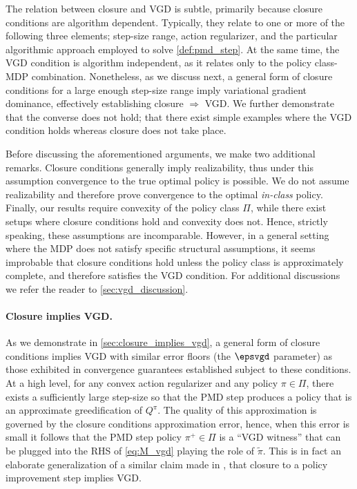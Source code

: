 The relation between closure and VGD is subtle, primarily because closure conditions are algorithm dependent. Typically, they relate to one or more of the following three elements; step-size range, action regularizer, and the particular algorithmic approach employed to solve \cref{def:pmd_step}.
At the same time, the VGD condition is algorithm independent, as it relates only to the policy class-MDP combination.
Nonetheless, as we discuss next, a general form of closure conditions for a large enough step-size range imply variational gradient dominance, effectively establishing closure $\Rightarrow$ VGD.
We further demonstrate that the converse does not hold; that there exist simple examples where the VGD condition holds whereas closure does not take place.


Before discussing the aforementioned arguments, we make two additional remarks. Closure conditions generally imply realizability, thus under this assumption convergence to the true optimal policy is possible. We do not assume realizability and therefore prove convergence to the optimal \emph{in-class} policy.
Finally, our results require convexity of the policy class $\Pi$, while there exist setups where closure conditions hold and convexity does not. Hence, strictly speaking, these assumptions are incomparable. However, in a general setting where the MDP does not satisfy specific structural assumptions, it seems improbable that closure conditions hold unless the policy class is approximately complete, and therefore satisfies the VGD condition.
For additional discussions we refer the reader to \cref{sec:vgd_discussion}.

\paragraph{Closure implies VGD.}
As we demonstrate in \cref{sec:closure_implies_vgd},
a general form of closure conditions  \citep{alfano2023novel} implies VGD with similar error floors (the $\epsvgd$ parameter) as those exhibited in convergence guarantees established subject to these conditions.
At a high level, for any convex action regularizer and any policy $\pi\in \Pi$, there exists a sufficiently large step-size so that the PMD step produces a policy that is an approximate greedification of $Q^\pi$. The quality of this approximation is governed by the closure conditions approximation error, hence, when this error is small it follows that the PMD step policy $\pi^+\in \Pi$ is a ``VGD witness'' that can be plugged into the RHS of \cref{eq:M_vgd} playing the role of $\tilde \pi$.
This is in fact an elaborate generalization of a similar claim made in \citet{bhandari2024global}, that closure to a policy improvement step implies VGD.

